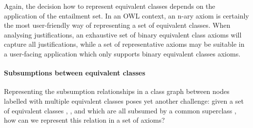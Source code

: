 Again, the decision how to represent equivalent classes depends on the application of the entailment set. In an OWL context, an n-ary  axiom is certainly the most user-friendly way of representing a set of equivalent classes. When analysing justifications, an exhaustive set of binary equivalent class axioms will capture all justifications, while a set of representative axioms may be suitable in a user-facing application which only supports binary equivalent classes axioms.

\paragraph{Subsumptions between equivalent classes}
Representing the subsumption relationships in a class graph between nodes labelled with multiple equivalent classes poses yet another challenge: given a set of equivalent classes , , and  which are all subsumed by a common superclass , how can we represent this relation in a set of axioms? 

